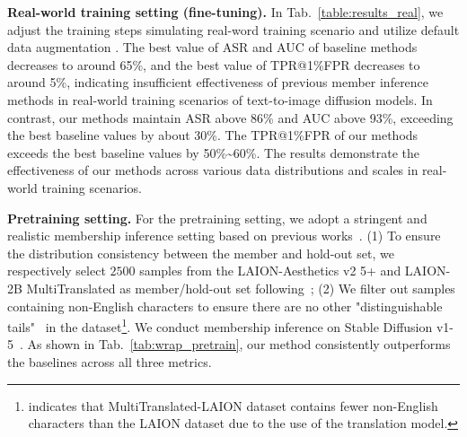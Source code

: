 \textbf{Real-world training setting (fine-tuning).}
In Tab.~\ref{table:results_real}, we adjust the training steps simulating real-word training scenario \cite{text-to-image-ft} and utilize default data augmentation \cite{text-to-image-ft-python}. The best value of ASR and AUC of baseline methods decreases to around 65\%, and the best value of TPR@1\%FPR decreases to around 5\%, indicating insufficient effectiveness of previous member inference methods in real-world training scenarios of text-to-image diffusion models. 
In contrast, our methods maintain ASR above 86\% and AUC above 93\%,  exceeding the best baseline values by about 30\%. The TPR@1\%FPR of our methods exceeds the best baseline values by  50\%\textasciitilde60\%.
The results demonstrate the effectiveness of our methods across various data distributions and scales in real-world training scenarios.



\textbf{Pretraining setting.}
For the pretraining setting, we adopt a stringent and realistic membership inference setting based on previous works~\cite{dubinski2024towards,das2024blind}. (1) To ensure the distribution consistency between the member and hold-out set, we respectively select $2500$ samples from the LAION-Aesthetics v2 5+ and LAION-2B MultiTranslated \cite{schuhmann2022laion} as member/hold-out set following~\cite{dubinski2024towards}; (2) We filter out samples containing non-English characters to ensure there are no other "distinguishable tails"~\cite{das2024blind} in the dataset\footnote{\citet{das2024blind} indicates that MultiTranslated-LAION dataset contains fewer non-English characters than the LAION dataset due to the use of the translation model. }.
We conduct membership inference on Stable Diffusion v1-5~\cite{rombach2022high}. 
As shown in Tab.~\ref{tab:wrap_pretrain}, our method consistently outperforms the baselines across all three metrics. 

